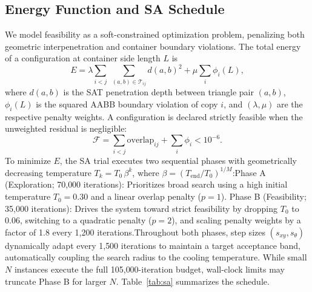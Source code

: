 \documentclass[10pt,twocolumn]{article}
\begin{document}
\subsection{Energy Function and SA Schedule}
We model feasibility as a soft-constrained optimization problem, penalizing both 
geometric interpenetration and container boundary violations. 
The total energy of a configuration at container side length
 $L$ is$$E = \lambda \sum_{i<j}\;\sum_{(a,b)\in\mathcal{T}_{ij}}d(a,b)^{2} + \mu \sum_i \phi_i(L), \label{eq:energy}$$
 where $d(a,b)$ is the SAT penetration depth between triangle pair $(a, b)$, $\phi_i(L)$ is the squared AABB 
 boundary violation of copy $i$, and $(\lambda, \mu)$ are the respective penalty weights. A configuration
  is declared strictly feasible when the unweighted residual is negligible:
  $$\mathcal{F} = \sum_{i<j} \text{overlap}_{ij} + \sum_i \phi_i < 10^{-6}.$$To minimize $E$, the SA trial 
  executes two sequential phases with geometrically decreasing temperature
   $T_k = T_0\,\beta^k$, where $\beta = (T_{\mathrm{end}}/T_0)^{1/M}$:Phase A (Exploration; 70{,}000 iterations): 
   Prioritizes broad search using a high initial temperature $T_0 = 0.30$ and a linear overlap penalty ($p = 1$).
   Phase B (Feasibility; 35{,}000 iterations): Drives the system toward strict feasibility 
   by dropping $T_0$ to $0.06$, switching to a quadratic penalty ($p = 2$), and scaling penalty weights by 
   a factor of 1.8 every 1{,}200 iterations.Throughout both phases, step sizes $(s_{xy}, s_\theta)$ 
   dynamically adapt every 1{,}500 iterations to maintain a target acceptance band, automatically coupling 
   the search radius to the cooling temperature. While small $N$ instances execute the full
    105{,}000-iteration budget, wall-clock limits may truncate Phase B for larger $N$. Table~\ref{tab:sa} 
    summarizes the schedule.
\end{document}
